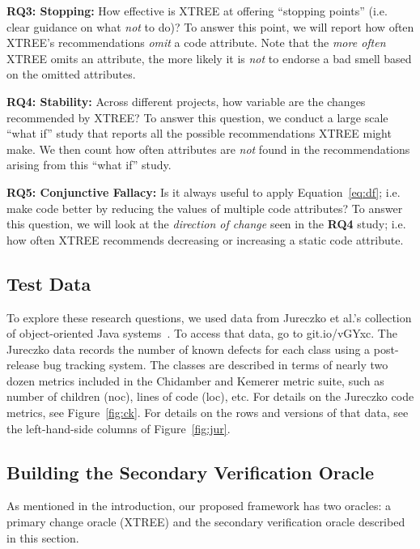 \documentclass[twocolumn,5p]{elsarticle}
\newcommand{\fig}[1]{Figure~\ref{fig:#1}}
\newcommand{\eq}[1]{Equation~\ref{eq:#1}}
\theoremstyle{break}
\begin{document}
\begin{itemize}
		{\bf RQ3: Stopping: }    How effective is XTREE at offering   ``stopping points'' (i.e. clear guidance on what {\em not} to do)?   
		To answer this point, we will report how often XTREE's recommendations {\em omit} a code attribute. 
		Note that the {\em more often} XTREE omits an attribute, the more likely it is {\em not} to endorse a bad smell based on the omitted
		attributes.
		
		{\bf RQ4: Stability:} Across different projects, how variable are the changes recommended by XTREE?   To answer this
		question, we conduct a large scale ``what if'' study that reports all the possible recommendations XTREE might make.
		We then count how often attributes are {\em not} found in the recommendations arising from this ``what if'' study.
		
		{\bf RQ5: Conjunctive Fallacy:} Is  it  always  useful  to  apply \eq{df}; i.e.   make  code  better  by  reducing  the  values  of multiple code attributes? To answer this question, we will look at the {\em direction of change} seen in the {\bf RQ4} study; i.e.
		how often XTREE recommends decreasing or increasing a static code attribute.
		
		
		
		
		
		\subsection{Test Data}\label{sect:tesd}
		
		To explore these research questions, we used data from Jureczko et al.'s collection of object-oriented Java systems~\cite{jureczko10}. To access that data, go to   git.io/vGYxc.
		The Jureczko data records the number of known defects for each class using a post-release bug tracking system. The classes are described in terms of nearly two dozen metrics included in the Chidamber and Kemerer metric suite, such as number of children (noc), lines of code (loc), etc. For details on the Jureczko code
		metrics, see  \fig{ck}. For details on the rows and versions of that data, see the left-hand-side columns of \fig{jur}.
		
		
		
		
		\subsection{Building the Secondary Verification Oracle}
		\label{sect:eval}
		
		As mentioned in the introduction, our proposed framework has two oracles:
		a primary change oracle (XTREE) and the secondary verification oracle described in this section.
		

\end{itemize}
\end{document}
